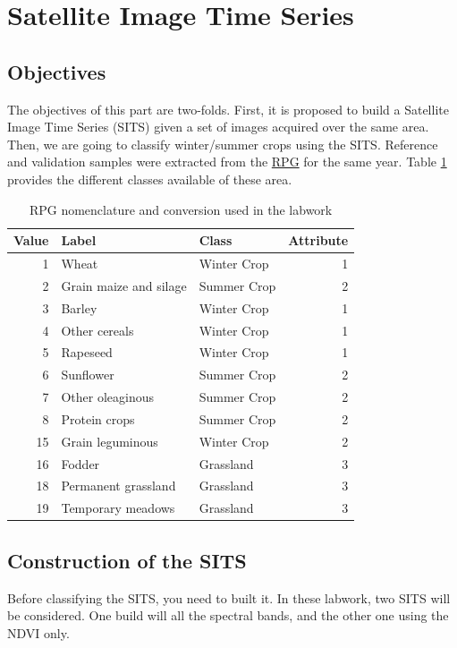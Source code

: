 \documentclass[a4paper,11pt,DIV=18]{scrartcl}
\begin{document}
\section{Satellite Image Time Series}
\label{sec:org8e3bea7}
\subsection{Objectives}
\label{sec:org9b4d345}
The objectives  of this part are  two-folds. First, it is  proposed to
build  a Satellite  Image Time  Series (SITS)  given a  set of  images
acquired  over  the  same  area.   Then,  we  are  going  to  classify
winter/summer crops  using the SITS. Reference  and validation samples
were extracted from the \href{https://www.data.gouv.fr/fr/datasets/registre-parcellaire-graphique-2012-contours-des-ilots-culturaux-et-leur-groupe-de-cultures-majorita/}{RPG} for  the same year. Table \ref{tab:orgd58a66d} provides
the different classes available of these area.

\begin{table}[htbp]
\caption{\label{tab:orgd58a66d}
RPG nomenclature and conversion used in the labwork}
\centering
\begin{tabular}{rllr}
\toprule
Value & Label & Class & Attribute\\
\midrule
1 & Wheat & Winter Crop & 1\\
2 & Grain maize and silage & Summer Crop & 2\\
3 & Barley & Winter Crop & 1\\
4 & Other cereals & Winter Crop & 1\\
5 & Rapeseed & Winter Crop & 1\\
6 & Sunflower & Summer Crop & 2\\
7 & Other oleaginous & Summer Crop & 2\\
8 & Protein crops & Summer Crop & 2\\
15 & Grain leguminous & Winter Crop & 2\\
16 & Fodder & Grassland & 3\\
18 & Permanent grassland & Grassland & 3\\
19 & Temporary meadows & Grassland & 3\\
\bottomrule
\end{tabular}
\end{table}

\subsection{Construction of the SITS}
\label{sec:orga4ea011}
Before classifying the  SITS, you need to built it.  In these labwork,
two SITS  will be considered. One  build will all the  spectral bands,
and the other one using the NDVI only.
\end{document}
